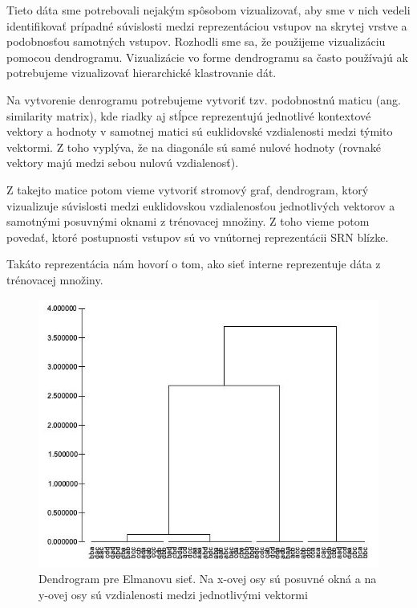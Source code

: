 Tieto dáta sme potrebovali nejakým spôsobom vizualizovať, aby sme v nich vedeli identifikovať prípadné súvislosti medzi reprezentáciou vstupov na skrytej vrstve a 
podobnosťou samotných vstupov.
Rozhodli sme sa, že použijeme vizualizáciu pomocou dendrogramu.
Vizualizácie vo forme dendrogramu sa často používajú ak potrebujeme vizualizovať hierarchické klastrovanie dát.

Na vytvorenie denrogramu potrebujeme vytvoriť tzv. podobnostnú maticu (ang. similarity matrix), kde 
riadky aj stĺpce reprezentujú jednotlivé kontextové vektory a hodnoty v samotnej matici sú euklidovské vzdialenosti medzi týmito vektormi.
Z toho vyplýva, že na diagonále sú samé nulové hodnoty (rovnaké vektory majú medzi sebou nulovú vzdialenosť).

Z takejto matice potom vieme vytvoriť stromový graf, dendrogram, ktorý vizualizuje súvislosti medzi euklidovskou vzdialenosťou jednotlivých vektorov a samotnými posuvnými oknami z trénovacej množiny.
Z toho vieme potom povedať, ktoré postupnosti vstupov sú vo vnútornej reprezentácii SRN blízke. 

Takáto reprezentácia nám hovorí o tom, ako sieť interne reprezentuje dáta z trénovacej množiny.

\begin{figure}[H]
    \centering
    \includegraphics[width=\textwidth]{assets/dendrogram}
    \caption{Dendrogram pre Elmanovu sieť. Na x-ovej osy sú posuvné okná a na y-ovej osy sú vzdialenosti medzi jednotlivými vektormi}
\end{figure}

